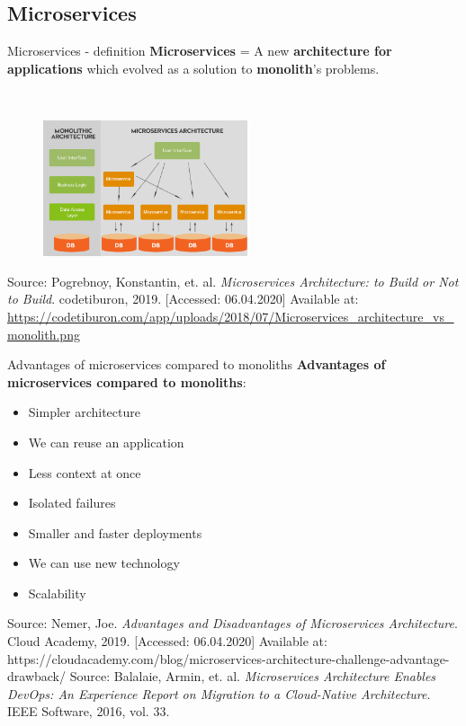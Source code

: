 \documentclass{beamer}
\begin{document}
\subsection{Microservices}
\begin{frame}{Microservices - definition}%
\textbf{Microservices} = A new \textbf{architecture for applications} which evolved as a solution to \textbf{monolith}'s problems.

~\\

\begin{figure}
	\includegraphics[width=6cm]{figures/Microservices_architecture_vs_monolith.png}
	\label{fig:micro-vs-mono}
\end{figure} 
\tiny{Source: Pogrebnoy, Konstantin, et. al. \textit{Microservices Architecture: to Build or Not to Build}. codetiburon, 2019. [Accessed: 06.04.2020] Available at: \url{https://codetiburon.com/app/uploads/2018/07/Microservices_architecture_vs_monolith.png}} 
\end{frame}

\begin{frame}{Advantages of microservices compared to monoliths}%
	\textbf{Advantages of microservices compared to monoliths}:
	\begin{itemize}
		\item Simpler architecture
		\item We can reuse an application
		\item Less context at once
		\item Isolated failures
		\item Smaller and faster deployments
		\item We can use new technology
		\item Scalability
	\end{itemize}
	
	\tiny{Source: Nemer, Joe. \textit{Advantages and Disadvantages of Microservices Architecture}. Cloud Academy, 2019. [Accessed: 06.04.2020] Available at: https://cloudacademy.com/blog/microservices-architecture-challenge-advantage-drawback/} 
	\tiny{Source: Balalaie, Armin, et. al. \textit{Microservices Architecture Enables DevOps: An Experience Report on Migration to a Cloud-Native Architecture}. IEEE Software, 2016, vol. 33.} 
	\end{frame}
\end{document}
